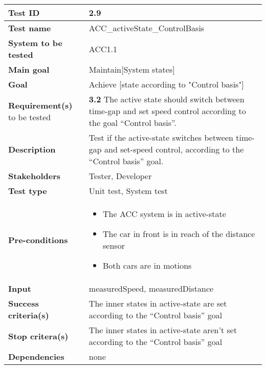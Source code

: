 	\begin{table}[H]
		\begin{tabular}{| p{4cm} | p{10cm} |}
			\hline
			\rowcolor{gray}
			{\bf Test ID} & 2.9 \\ \hline
			{\bf Test name} & ACC\_activeState\_ControlBasis\\ \hline
			{\bf System to be tested} & ACC1.1\\ \hline
			{\bf Main goal} & Maintain[System states]\\ \hline
			{\bf Goal} & Achieve [state according to "Control basis"]\\ \hline
			{\bf Requirement(s)} to be tested & {\bf 3.2} The active state should switch 
			between time-gap and set speed control according to the goal “Control basis”.
			\\ \hline
			{\bf Description} & Test if the active-state switches between time-gap and 
			set-speed control, according to the “Control basis” goal. \\ \hline
			{\bf Stakeholders} & Tester, Developer \\ \hline
			{\bf Test type} & Unit test, System test\\ \hline
			{\bf Pre-conditions} & \begin{itemize} 
			\item The ACC system is in active-state
			\item The car in front is in reach of the distance sensor
			\item Both cars are in motions 
			\end{itemize} \\ \hline
			{\bf Input} & measuredSpeed, measuredDistance \\ \hline
			{\bf Success criteria(s)} & The inner states in active-state are set according 
			to the “Control basis” goal\\ \hline
			{\bf Stop critera(s)} & The inner states in active-state aren’t set according 
			to the “Control basis” goal\\ \hline
			{\bf Dependencies} & none \\ \hline
		\end{tabular}
	\end{table}

	